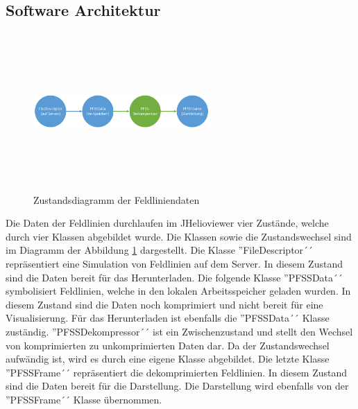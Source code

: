 \subsection{Software Architektur}
\begin{figure}[!htbp]
	\center
	\includegraphics[width=0.6\textwidth,height=6cm,keepaspectratio]{./pictures/implementation/dataflow.png}
	\caption{Zustandsdiagramm der Feldliniendaten}
	\label{implementation:architektur:datenfluss}
\end{figure}
Die Daten der Feldlinien durchlaufen im JHelioviewer vier Zustände, welche durch vier Klassen abgebildet wurde. Die Klassen sowie die Zustandswechsel sind im Diagramm der Abbildung \ref{implementation:architektur:datenfluss} dargestellt. Die Klasse ''FileDescriptor´´ repräsentiert eine Simulation von Feldlinien auf dem Server. In diesem Zustand sind die Daten bereit für das Herunterladen. Die folgende Klasse ''PFSSData´´ symbolisiert Feldlinien, welche in den lokalen Arbeitsspeicher geladen wurden. In diesem Zustand sind die Daten noch komprimiert und nicht bereit für eine Visualisierung. Für das Herunterladen ist ebenfalls die ''PFSSData´´ Klasse zuständig. ''PFSSDekompressor´´ ist ein Zwischenzustand und stellt den Wechsel von komprimierten zu unkomprimierten Daten dar. Da der Zustandswechsel aufwändig ist, wird es durch eine eigene Klasse abgebildet. Die letzte Klasse ''PFSSFrame´´ repräsentiert die dekomprimierten Feldlinien. In diesem Zustand sind die Daten bereit für die Darstellung. Die Darstellung wird ebenfalls von der ''PFSSFrame´´ Klasse übernommen.

